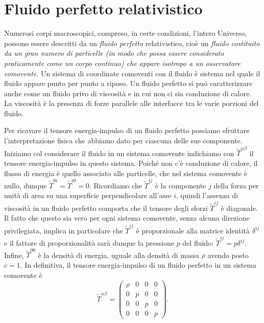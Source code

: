 \section{Fluido perfetto relativistico}
\label{sec:fluido-perfetto}

Numerosi corpi macroscopici, compreso, in certe condizioni, l'intero Universo,
possono essere descritti da un \emph{fluido perfetto}
relativistico, cioè un
\emph{fluido costituito da un gran numero di particelle (in modo che possa
  essere considerato praticamente come un corpo continuo) che appare isotropo a
  un osservatore comovente}.
Un sistema di coordinate comoventi con il fluido è sistema nel quale il fluido
appare punto per punto a riposo.  Un fluido perfetto si può caratterizzare anche
come un fluido privo di viscosità e in cui non ci sia conduzione di calore.  La
viscosità è la presenza di forze parallele alle interfacce tra le varie porzioni
del fluido.

Per ricavare il tensore energia-impulso di un fluido perfetto possiamo sfruttare
l'interpretazione fisica che abbiamo dato per ciascuna delle sue componente.
Iniziamo col considerare il fluido in un sistema comovente indichiamo con
$\tilde T^{\alpha\beta}$ il tensore energia-impulso in questo sistema.  Poiché
non c'è conduzione di calore, il flusso di energia è quello associato alle
particelle, che nel sistema comovente è nullo, dunque
$\tilde T^{0i} = \tilde T^{i0} = 0$.  Ricordiamo che $\tilde T^{ij}$ è la
componente $j$ della forza per unità di area su una superficie perpendicolare
all'asse $i$, quindi l'assenza di viscosità in un fluido perfetto comporta che
il tensore degli sforzi $\tilde T^{ij}$ è diagonale.  Il fatto che questo sia
vero per ogni sistema comovente, senza alcuna direzione privilegiata, implica in
particolare che $\tilde T^{ij}$ è proporzionale alla matrice identità
$\delta^{ij}$ e il fattore di proporzionalità sarà dunque la pressione $p$ del
fluido: $\tilde T^{ij} = p \delta^{ij}$.  Infine, $\tilde T^{00}$ è la densità
di energia, uguale alla densità di massa $\rho$ avendo posto $c = 1$.  In
definitiva, il tensore energia-impulso di un fluido perfetto in un sistema
comovente è
\begin{equation}
  \tilde T^{\alpha\beta} =
  \begin{pmatrix}
    \rho & 0 & 0 & 0 \\
    0    & p & 0 & 0 \\
    0    & 0 & p & 0 \\
    0    & 0 & 0 & p
  \end{pmatrix}.
\end{equation}

